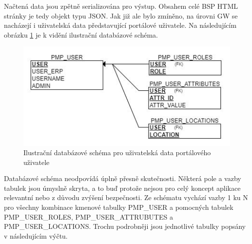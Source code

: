 \documentclass[thesis=M,czech]{FITthesis}[2012/06/26]
\begin{document}
Načtená data jsou zpětně serializována pro výstup. Obsahem celé BSP HTML stránky je tedy objekt typu JSON. Jak již ale bylo zmíněno, na úrovni GW se nacházejí i uživatelská data představující portálové uživatele. Na následujícím obrázku \ref{img:gw_db} je k vidění ilustrační databázové schéma. 

\begin{figure}[H]
	\centering
	\includegraphics[]{images/gw_db}
	\caption{Ilustrační databázové schéma pro uživatelská data portálového uživatele}
	\label{img:gw_db}
\end{figure}

Databázové schéma neodpovídá úplně přesně skutečnosti. Některá pole a vazby tabulek jsou úmyslně skryta, a to buď protože nejsou pro celý koncept aplikace relevantní nebo z důvodu zvýšení bezpečnosti. Ze schématu vychází vazby 1 ku N pro všechny kombinace kmenové tabulky PMP\_USER a pomocných tabulek PMP\_USER\_ROLES, PMP\_USER\_ATTRUBUTES a PMP\_USER\_LOCATIONS. Trochu podrobněji jsou jednotlivé tabulky popsány v následujícím výčtu.
\end{document}
